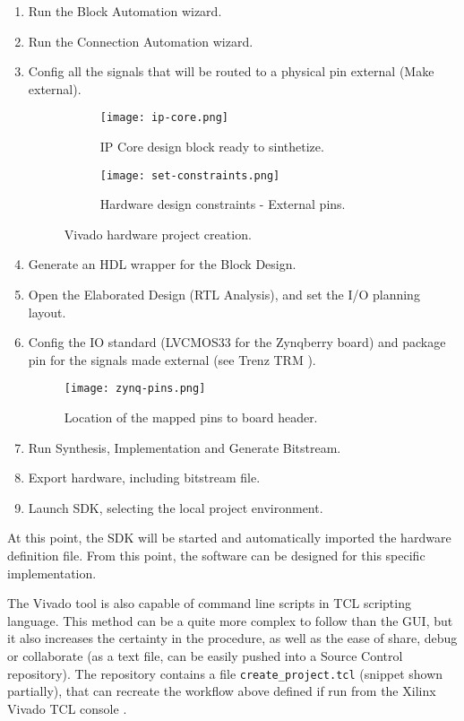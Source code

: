 \begin{enumerate}
\begin{enumerate}
	\end{enumerate}
	\item Run the Block Automation wizard.
	\item Run the Connection Automation wizard.
	\item Config all the signals that will be routed to a physical pin external (Make external).
	\begin{figure}[htp]
		\centering
		\begin{subfigure}{0.45\textwidth}
			\texttt{[image: ip-core.png]}
			\caption{IP Core design block ready to sinthetize.} \label{fig:ip-core}
		\end{subfigure} \hfill
		\begin{subfigure}{0.45\textwidth}
			\texttt{[image: set-constraints.png]}
			\caption{Hardware design constraints - External pins.} \label{fig:set-constraints}
		\end{subfigure}%
		\caption{Vivado hardware project creation.}
	\end{figure}%
	\item Generate an HDL wrapper for the Block Design.
	\item Open the Elaborated Design (RTL Analysis), and set the I/O planning layout.
	\item Config the IO standard (LVCMOS33 for the Zynqberry board) and package pin for the signals made external (see Trenz TRM \cite{zynq-trm}).
	\begin{figure}[htb]
		\centering
		\texttt{[image: zynq-pins.png]}
		\caption{Location of the mapped pins to board header.} \label{fig:zynq-pins}
	\end{figure}
	\item Run Synthesis, Implementation and Generate Bitstream.
	\item Export hardware, including bitstream file.
	\item Launch SDK, selecting the local project environment.
\end{enumerate}

At this point, the SDK will be started and automatically imported the hardware definition file. From this point, the software can be designed for this specific implementation.

The Vivado tool is also capable of command line scripts in TCL scripting language. This method can be a quite more complex to follow than the GUI, but it also increases the certainty in the procedure, as well as the ease of share, debug or collaborate (as a text file, can be easily pushed into a Source Control repository). The repository contains a file \texttt{create\_project.tcl} (snippet shown partially), that can recreate the workflow above defined if run from the Xilinx Vivado TCL console \cite{UG835}.

